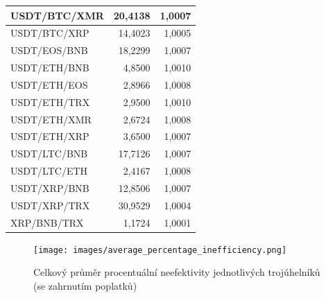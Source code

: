 \documentclass[thesis=B,czech]{FITthesis}[2019/03/21]
\begin{document}
\begin{table}
\begin{tabular}{|| l | r | r ||}
 \hline USDT/BTC/XMR & 20,4138 & 1,0007\\ 
 \hline USDT/BTC/XRP & 14,4023 & 1,0005\\ 
 \hline USDT/EOS/BNB & 18,2299 & 1,0007\\ 
 \hline USDT/ETH/BNB & 4,8500 & 1,0010\\ 
 \hline USDT/ETH/EOS & 2,8966 & 1,0008\\ 
 \hline USDT/ETH/TRX & 2,9500 & 1,0010\\ 
 \hline USDT/ETH/XMR & 2,6724 & 1,0008\\ 
 \hline USDT/ETH/XRP & 3,6500 & 1,0007\\ 
 \hline USDT/LTC/BNB & 17,7126 & 1,0007\\ 
 \hline USDT/LTC/ETH & 2,4167 & 1,0008\\ 
 \hline USDT/XRP/BNB & 12,8506 & 1,0007\\ 
 \hline USDT/XRP/TRX & 30,9529 & 1,0004\\ 
 \hline XRP/BNB/TRX & 1,1724 & 1,0001\\ 
 \hline
\end{tabular}
\end{table}

\begin{figure}[h]\centering
	\texttt{[image: images/average\_percentage\_inefficiency.png]}
	\caption{Celkový průměr procentuální neefektivity jednotlivých trojúhelníků (se zahrnutím poplatků)}\label{average_percentage_inefficiency}
\end{figure}
\end{document}
